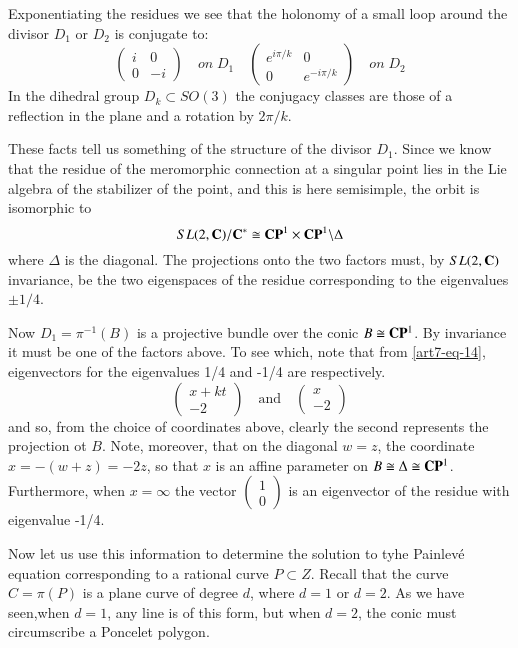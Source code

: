 \begin{remark*}
Exponentiating the residues we see that the holonomy of a small loop around the divisor $D_{1}$ or $D_{2}$ is conjugate to:
$$
\left(
\begin{matrix}
i  & 0\\
0 & -i
\end{matrix}
\right)
\quad on \; D_{1} \quad
\left(
\begin{matrix}
e^{i\pi /k}  & 0\\
0 & e^{-i\pi/k}
\end{matrix}
\right)
\quad on \; D_{2}
$$
In the dihedral group $D_{k} \subset SO(3)$ the conjugacy classes are those of a reflection in the plane and a rotation by $2\pi/k$.

These facts tell us something of the structure of the divisor $D_{1}$. Since we know that the residue of the meromorphic connection at a singular point lies in the Lie algebra of the stabilizer of the point, and this is here semisimple,
 the orbit is isomorphic to
 $$
 SL(2, \mathbf{C})/\mathbf{C}^{*} \cong \mathbf{C}\mathbf{P}^{1} \times \mathbf{C}\mathbf{P}^{1}\backslash \Delta
 $$
 where $\Delta$ is the diagonal. The projections onto the two factors must, by $SL(2, \mathbf{C})$ invariance, be the two eigenspaces of the residue corresponding to the eigenvalues $\pm1/4$.

 Now $D_{1}= \pi^{-1}(B)$ is a projective bundle over the conic $B\cong \mathbf{C}\mathbf{P}^{1}$. By invariance it must be one of the factors above. To see which, note that from \eqref{art7-eq-14}, eigenvectors for the eigenvalues 1/4 and -1/4 are respectively.
 $$
 \left(
 \begin{matrix}
x+kt\\
-2
 \end{matrix}
\right)
\quad \text{and}\quad
\left(
 \begin{matrix}
x\\
-2
 \end{matrix}
\right)
$$
and so, from the choice of coordinates above, clearly the second represents the projection ot $B$. Note, moreover, that on the diagonal $w=z$, the coordinate $x=-(w+z)=-2z$, so that $x$ is an affine parameter on $B\cong \Delta \cong \mathbf{C}\mathbf{P}^{1}$. Furthermore, when $x=\infty$ the vector
$
\left(
\begin{matrix}
1\\
0
\end{matrix}
\right)
$
is an eigenvector of the residue with eigenvalue -1/4.

Now let us use this information to determine the solution to tyhe Painlev\'e equation corresponding to a rational curve $P\subset Z$. Recall that the curve $C=\pi(P)$ is a plane curve of degree $d$, where $d=1$ or $d=2$. As we have seen,when $d=1$, any line is of this form, but when $d=2$, the conic must circumscribe a Poncelet polygon.


\end{remark*}
